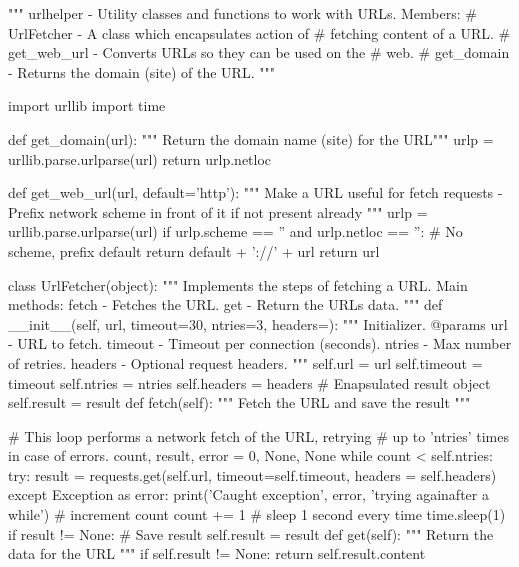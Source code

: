 \begin{VerbatimBold}
"""
urlhelper - Utility classes and functions to work with URLs.
Members:
# UrlFetcher - A class which encapsulates action of
# fetching content of a URL.
# get_web_url - Converts URLs so they can be used on the
# web.
# get_domain - Returns the domain (site) of the URL.
"""

import urllib
import time


def get_domain(url):
    """ Return the domain name (site) for the URL"""
    urlp = urllib.parse.urlparse(url)
    return urlp.netloc

def get_web_url(url, default='http'):
    """ Make a URL useful for fetch requests
    - Prefix network scheme in front of it if not present already
    """
    urlp = urllib.parse.urlparse(url)
    if urlp.scheme == '' and urlp.netloc == '':
        # No scheme, prefix default
        return default + '://' + url
    return url

class UrlFetcher(object):
    """ Implements the steps of fetching a URL.
    Main methods:
    fetch - Fetches the URL.
    get - Return the URLs data.
    """
    def __init__(self, url, timeout=30, ntries=3, headers={}):
        """ Initializer.
        @params
            url - URL to fetch.
            timeout - Timeout per connection (seconds).
            ntries - Max number of retries.
            headers - Optional request headers.
        """ 
        self.url = url
        self.timeout = timeout
        self.ntries = ntries
        self.headers = headers
        # Enapsulated result object
        self.result = result
    def fetch(self):
        """ Fetch the URL and save the result """
        
        # This loop performs a network fetch of the URL, retrying
        # up to 'ntries' times in case of errors.
        count, result, error = 0, None, None
        while count < self.ntries:
            try:
                result = requests.get(self.url,
                timeout=self.timeout,
                headers = self.headers)
            except Exception as error:
                print('Caught exception', error, 'trying againafter a while')
                # increment count
                count += 1
                # sleep 1 second every time
                time.sleep(1)
        if result != None:
            # Save result
            self.result = result
    def get(self):
        """ Return the data for the URL """
        if self.result != None:
            return self.result.content
\end{VerbatimBold}

